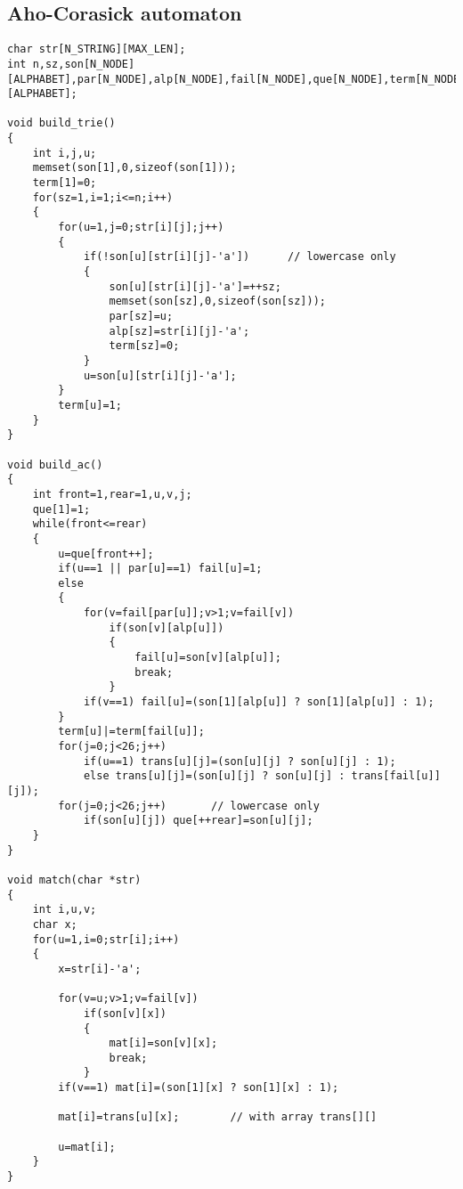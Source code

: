 \documentclass[a4paper,12pt]{article}
\begin{document}
\subsection{Aho-Corasick automaton}
\begin{lstlisting}
char str[N_STRING][MAX_LEN];
int n,sz,son[N_NODE][ALPHABET],par[N_NODE],alp[N_NODE],fail[N_NODE],que[N_NODE],term[N_NODE],mat[LENGTH],trans[N_NODE][ALPHABET];

void build_trie()
{
    int i,j,u;
    memset(son[1],0,sizeof(son[1]));
    term[1]=0;
    for(sz=1,i=1;i<=n;i++)
    {
        for(u=1,j=0;str[i][j];j++)
        {
            if(!son[u][str[i][j]-'a'])      // lowercase only
            {
                son[u][str[i][j]-'a']=++sz;
                memset(son[sz],0,sizeof(son[sz]));
                par[sz]=u;
                alp[sz]=str[i][j]-'a';
                term[sz]=0;
            }
            u=son[u][str[i][j]-'a'];
        }
        term[u]=1;
    }
}

void build_ac()
{
    int front=1,rear=1,u,v,j;
    que[1]=1;
    while(front<=rear)
    {
        u=que[front++];
        if(u==1 || par[u]==1) fail[u]=1;
        else
        {
            for(v=fail[par[u]];v>1;v=fail[v])
                if(son[v][alp[u]])
                {
                    fail[u]=son[v][alp[u]];
                    break;
                }
            if(v==1) fail[u]=(son[1][alp[u]] ? son[1][alp[u]] : 1);
        }
        term[u]|=term[fail[u]];
        for(j=0;j<26;j++)
            if(u==1) trans[u][j]=(son[u][j] ? son[u][j] : 1);
            else trans[u][j]=(son[u][j] ? son[u][j] : trans[fail[u]][j]); 
        for(j=0;j<26;j++)       // lowercase only
            if(son[u][j]) que[++rear]=son[u][j];
    }
}

void match(char *str)
{
    int i,u,v;
    char x;
    for(u=1,i=0;str[i];i++)
    {
        x=str[i]-'a';

        for(v=u;v>1;v=fail[v])
            if(son[v][x])
            {
                mat[i]=son[v][x];
                break;
            }
        if(v==1) mat[i]=(son[1][x] ? son[1][x] : 1);

        mat[i]=trans[u][x];        // with array trans[][]

        u=mat[i];
    }
}
\end{lstlisting}
\end{document}
